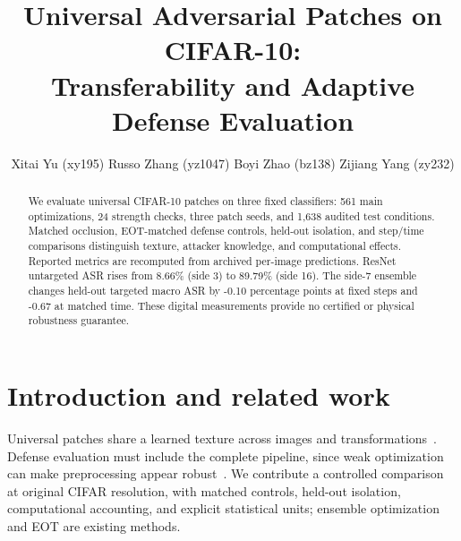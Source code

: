 \documentclass{article}
\title{Universal Adversarial Patches on CIFAR-10:\\Transferability and Adaptive Defense Evaluation}
\author{Xitai Yu (xy195) \And Russo Zhang (yz1047) \AND Boyi Zhao (bz138) \And Zijiang Yang (zy232)}
\begin{document}
\maketitle
\begin{abstract}
We evaluate universal CIFAR-10 patches on three fixed classifiers: 561 main optimizations, 24 strength checks, three patch seeds, and 1,638 audited test conditions. Matched occlusion, EOT-matched defense controls, held-out isolation, and step/time comparisons distinguish texture, attacker knowledge, and computational effects. Reported metrics are recomputed from archived per-image predictions.
ResNet untargeted ASR rises from 8.66\% (side 3) to 89.79\% (side 16). The side-7 ensemble changes held-out targeted macro ASR by -0.10 percentage points at fixed steps and -0.67 at matched time. These digital measurements provide no certified or physical robustness guarantee.
\end{abstract}
\section{Introduction and related work}
Universal patches share a learned texture across images and transformations~\cite{brown}. Defense evaluation must include the complete pipeline, since weak optimization can make preprocessing appear robust~\cite{athalye}. We contribute a controlled comparison at original CIFAR resolution, with matched controls, held-out isolation, computational accounting, and explicit statistical units; ensemble optimization and EOT are existing methods.
\end{document}
